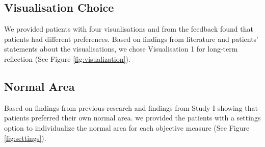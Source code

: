 \subsection*{Visualisation Choice}
We provided patients with four visualisations and from the feedback found that patients had different preferences. Based on findings from literature and patients' statements about the visualisations, we chose Visualisation 1 for long-term reflection (See Figure \ref{fig:visualization}). 
 
\subsection*{Normal Area}
Based on findings from previous research and findings from Study I showing that patients preferred their own normal area. we provided the patients with a settings option to individualize the normal area for each objective measure (See Figure \ref{fig:settings}). 


